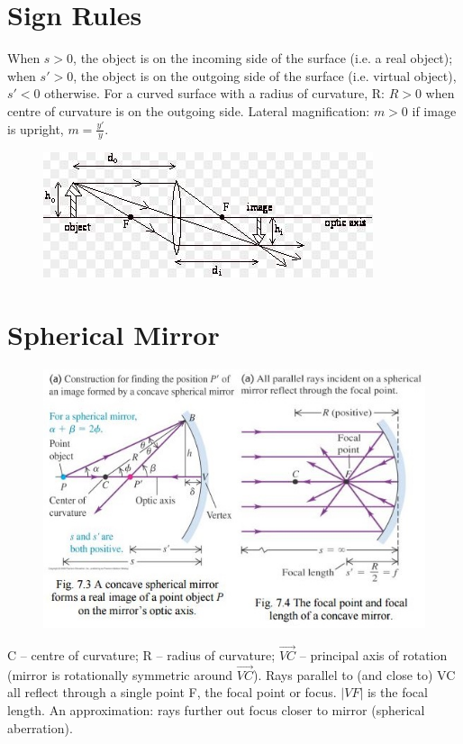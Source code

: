 \documentclass[a4paper, 11pt, normalem]{report}
\begin{document}
\section{Sign Rules}
When $s > 0$, the object is on the incoming side of the surface (i.e. a real object); when $s' > 0$, the object is on the outgoing side of the surface (i.e. virtual object), $s' < 0$ otherwise.
For a curved surface with a radius of curvature, R: $R > 0$ when centre of curvature is on the outgoing side.
Lateral magnification: $m > 0$ if image is upright, $m = \frac{y'}{y}$.
\begin{figure}[H]
    \centering
    \includegraphics{Lats.jpg}
\end{figure}

\section{Spherical Mirror}
\begin{figure}[H]
    \centering
    \includegraphics{Mirrors.jpg}
\end{figure}
C -- centre of curvature; R -- radius of curvature; $\overrightarrow{VC}$ -- principal axis of rotation (mirror is rotationally symmetric around $\overrightarrow{VC}$).
Rays parallel to (and close to) VC all reflect through a single point F, the focal point or focus.
$|VF|$ is the focal length.
An approximation: rays further out focus closer to mirror (spherical aberration).
\end{document}
